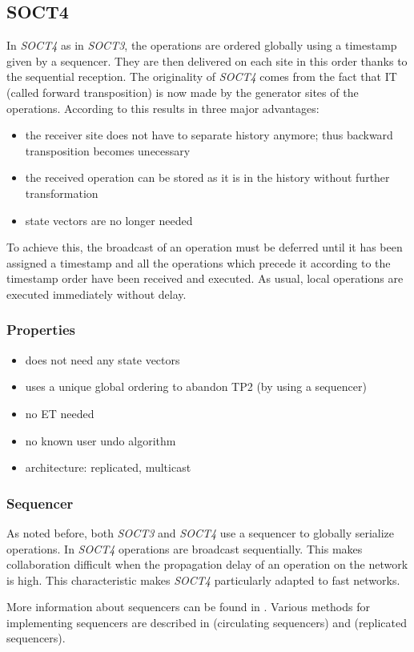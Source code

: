 \subsection{SOCT4}
\label{algo:soct4}

In \emph{SOCT4} \cite{suleiman00} as in \emph{SOCT3}, the operations are ordered globally using a timestamp given by a sequencer. They are then delivered on each site in this order thanks to the sequential reception. The originality of \emph{SOCT4} comes from the fact that IT (called forward transposition) is now made by the generator sites of the operations. According to \cite{suleiman00} this results in three major advantages:

\begin{itemize}
 \item the receiver site does not have to separate history anymore; 
       thus backward transposition becomes unecessary
 \item the received operation can be stored as it is in the history
       without further transformation
 \item state vectors are no longer needed
\end{itemize}

To achieve this, the broadcast of an operation must be deferred until it has been assigned a timestamp and all the operations which precede it according to the timestamp order have been received and executed. As usual, local operations are executed immediately without delay.


\subsubsection{Properties}
\begin{itemize}
 \item does not need any state vectors
 \item uses a unique global ordering to abandon TP2 (by using a sequencer)
 \item no ET needed
 \item no known user undo algorithm
 \item architecture: replicated, multicast
\end{itemize}


\subsubsection{Sequencer}
\label{sequencer}
As noted before, both \emph{SOCT3} and \emph{SOCT4} use a sequencer to globally serialize operations. In \emph{SOCT4} operations are broadcast sequentially. This makes collaboration difficult when the propagation delay of an operation on the network is high. This characteristic makes \emph{SOCT4} particularly adapted to fast networks.

More information about sequencers can be found in \cite{reed79}. Various methods for implementing sequencers are described in \cite{lelann78} (circulating sequencers) and \cite{banino79} (replicated sequencers).

